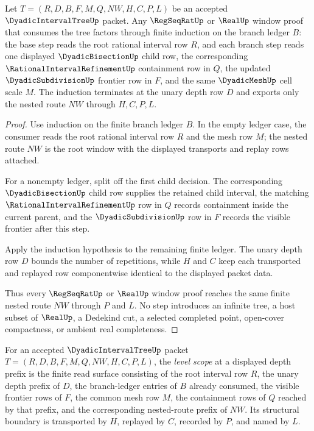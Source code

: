 \begin{theorem}
\label{thm:dyadic-interval-tree-refinement-induction}
Let $T=(R,D,B,F,M,Q,NW,H,C,P,L)$ be an accepted $\DyadicIntervalTreeUp$ packet. Any $\RegSeqRatUp$ or $\RealUp$ window proof that consumes the tree factors through finite induction on the branch ledger $B$: the base step reads the root rational interval row $R$, and each branch step reads one displayed $\DyadicBisectionUp$ child row, the corresponding $\RationalIntervalRefinementUp$ containment row in $Q$, the updated $\DyadicSubdivisionUp$ frontier row in $F$, and the same $\DyadicMeshUp$ cell scale $M$. The induction terminates at the unary depth row $D$ and exports only the nested route $NW$ through $H,C,P,L$.
\end{theorem}
\begin{proof}
Use induction on the finite branch ledger $B$. In the empty ledger case, the consumer reads the root rational interval row $R$ and the mesh row $M$; the nested route $NW$ is the root window with the displayed transports and replay rows attached.

For a nonempty ledger, split off the first child decision. The corresponding $\DyadicBisectionUp$ child row supplies the retained child interval, the matching $\RationalIntervalRefinementUp$ row in $Q$ records containment inside the current parent, and the $\DyadicSubdivisionUp$ row in $F$ records the visible frontier after this step.

Apply the induction hypothesis to the remaining finite ledger. The unary depth row $D$ bounds the number of repetitions, while $H$ and $C$ keep each transported and replayed row componentwise identical to the displayed packet data.

Thus every $\RegSeqRatUp$ or $\RealUp$ window proof reaches the same finite nested route $NW$ through $P$ and $L$. No step introduces an infinite tree, a host subset of $\RealUp$, a Dedekind cut, a selected completed point, open-cover compactness, or ambient real completeness.
\end{proof}

\begin{definition}
\label{def:dyadic-interval-tree-level-scope}
For an accepted $\DyadicIntervalTreeUp$ packet $T=(R,D,B,F,M,Q,NW,H,C,P,L)$, the \emph{level scope} at a displayed depth prefix is the finite read surface consisting of the root interval row $R$, the unary depth prefix of $D$, the branch-ledger entries of $B$ already consumed, the visible frontier rows of $F$, the common mesh row $M$, the containment rows of $Q$ reached by that prefix, and the corresponding nested-route prefix of $NW$. Its structural boundary is transported by $H$, replayed by $C$, recorded by $P$, and named by $L$.
\end{definition}

